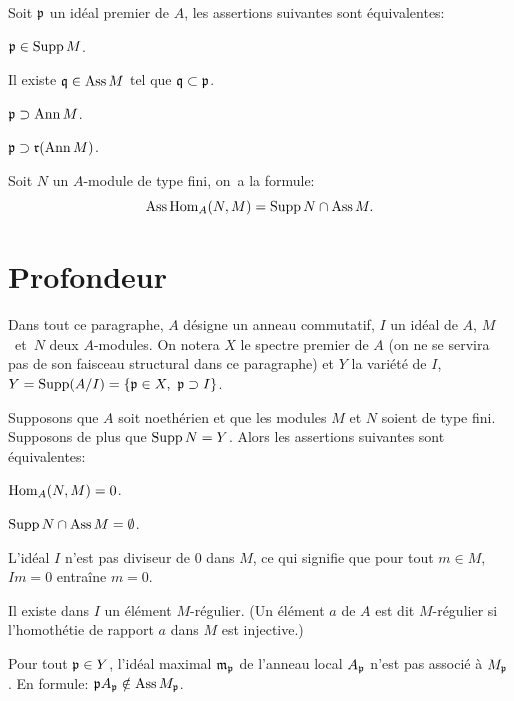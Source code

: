\begin{proposition} \label{III.1.2}
Soit $\mathfrak{p} $ un id\'eal premier de $A$, les assertions suivantes sont \'equivalentes:
\begin{enumeratei}
\item
$\mathfrak{p} \in \operatorname{Supp} M$.

\item
Il existe $\mathfrak{q} \in \operatorname{Ass} M$ tel que $\mathfrak{q} \subset\mathfrak{p} $.

\item
$\mathfrak{p} \supset \operatorname{Ann} M$.

\item[\textup{(iii bis)}]
$\mathfrak{p} \supset \mathfrak{r}(\operatorname{Ann} M)$.
\end{enumeratei}
\end{proposition}

\begin{proposition} \label{III.1.3}
Soit $N$ un $A$-module de type fini, on~a la formule:
\[
\operatorname{Ass} \operatorname{Hom}_A(N, M) = \operatorname{Supp} N \cap \operatorname{Ass} M.
\]
\end{proposition}

\section{Profondeur} \label{III.2}

Dans tout ce paragraphe, $A$ d\'esigne un anneau commutatif, $I$ un id\'eal de $A$, $M$~et~$N$ deux $A$-modules. On notera $X$ le spectre premier de $A$ (on ne se servira pas de son faisceau structural dans ce paragraphe) et $Y$ la vari\'et\'e de $I$, $Y = \operatorname{Supp}(A/I) = \{\mathfrak{p} \in X, \ \mathfrak{p} \supset I\}$.

\begin{lemme} \label{III.2.1}
Supposons que $A$ soit noeth\'erien et que les modules $M$ et $N$ soient de type fini. Supposons de plus que $\operatorname{Supp} N=Y$. Alors les assertions suivantes sont \'equivalentes:
\begin{enumeratei}
\item
$\operatorname{Hom}_A(N, M)=0$.
\item
$\operatorname{Supp} N \cap \operatorname{Ass} M = \emptyset$.
\item
L'id\'eal $I$ n'est pas diviseur de $0$ dans $M$, ce qui signifie que pour tout $m\in M$, $Im=0$ entra\^ine $m=0$.
\item
Il existe dans $I$ un \'el\'ement $M$-r\'egulier. (Un \'el\'ement $a$ de $A$ est dit $M$-r\'egulier si l'homoth\'etie de rapport $a$ dans $M$ est injective.)

\item
Pour tout $\mathfrak{p} \in Y$, l'id\'eal maximal $\mathfrak{m}_{\mathfrak{p}}$ de l'anneau local $A_{\mathfrak{p}}$ n'est pas associ\'e \`a $M_{\mathfrak{p}}$. En formule: $\mathfrak{p} A_{\mathfrak{p}} \notin \operatorname{Ass} M_{\mathfrak{p}}$.
\end{enumeratei}
\end{lemme}

